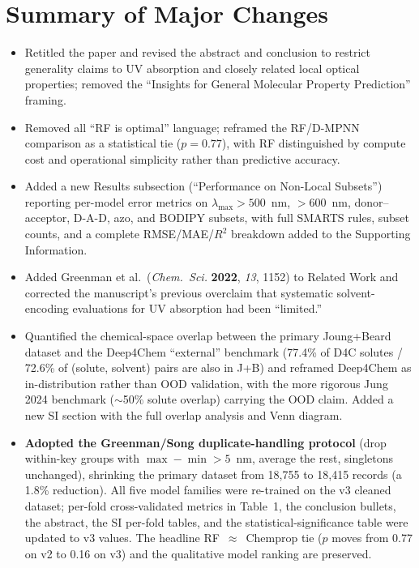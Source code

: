 \documentclass[11pt]{article}
\begin{document}
\section*{Summary of Major Changes}
\begin{itemize}[leftmargin=2em]
  \item Retitled the paper and revised the abstract and conclusion to restrict generality claims to UV absorption and closely related local optical properties; removed the ``Insights for General Molecular Property Prediction'' framing.
  \item Removed all ``RF is optimal'' language; reframed the RF/D-MPNN comparison as a statistical tie ($p = 0.77$), with RF distinguished by compute cost and operational simplicity rather than predictive accuracy.
  \item Added a new Results subsection (``Performance on Non-Local Subsets'') reporting per-model error metrics on $\lambda_{\max} > 500$~nm, $> 600$~nm, donor--acceptor, D-A-D, azo, and BODIPY subsets, with full SMARTS rules, subset counts, and a complete RMSE/MAE/$R^2$ breakdown added to the Supporting Information.
  \item Added Greenman et al.\ (\textit{Chem.\ Sci.} \textbf{2022}, \textit{13}, 1152) to Related Work and corrected the manuscript's previous overclaim that systematic solvent-encoding evaluations for UV absorption had been ``limited.''
  \item Quantified the chemical-space overlap between the primary Joung+Beard dataset and the Deep4Chem ``external'' benchmark (77.4\% of D4C solutes / 72.6\% of (solute, solvent) pairs are also in J+B) and reframed Deep4Chem as in-distribution rather than OOD validation, with the more rigorous Jung 2024 benchmark ($\sim$50\% solute overlap) carrying the OOD claim. Added a new SI section with the full overlap analysis and Venn diagram.
  \item \textbf{Adopted the Greenman/Song duplicate-handling protocol} (drop within-key groups with $\max - \min > 5$~nm, average the rest, singletons unchanged), shrinking the primary dataset from 18{,}755 to 18{,}415 records (a 1.8\% reduction). All five model families were re-trained on the v3 cleaned dataset; per-fold cross-validated metrics in Table~1, the conclusion bullets, the abstract, the SI per-fold tables, and the statistical-significance table were updated to v3 values. The headline RF~$\approx$~Chemprop tie ($p$ moves from 0.77 on v2 to 0.16 on v3) and the qualitative model ranking are preserved.

\end{itemize}
\end{document}
